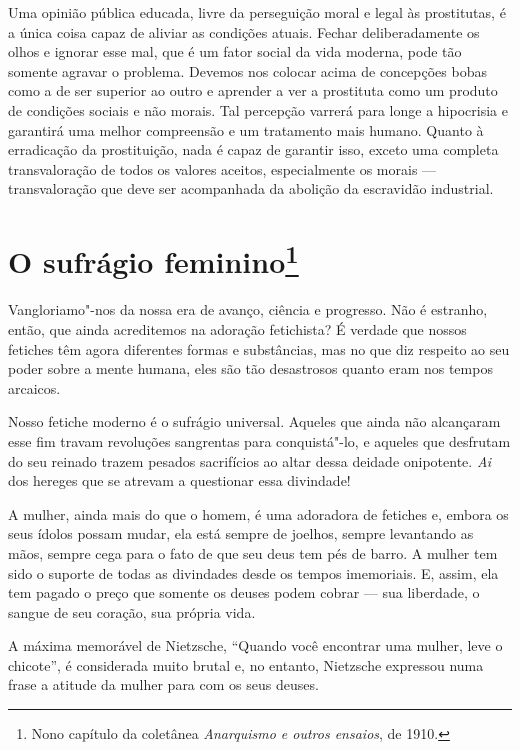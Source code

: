 Uma opinião pública educada, livre da perseguição moral e legal às
prostitutas, é a única coisa capaz de aliviar as condições atuais.
Fechar deliberadamente os olhos e ignorar esse mal, que é um fator
social da vida moderna, pode tão somente agravar o problema. Devemos nos
colocar acima de concepções bobas como a de ser superior ao outro e
aprender a ver a prostituta como um produto de condições sociais e não
morais. Tal percepção varrerá para longe a hipocrisia e garantirá uma
melhor compreensão e um tratamento mais humano. Quanto à erradicação da
prostituição, nada é capaz de garantir isso, exceto uma completa
transvaloração de todos os valores aceitos, especialmente os morais --- transvaloração que deve ser acompanhada da abolição da escravidão
industrial.

\chapter{O sufrágio feminino\footnote{Nono capítulo da coletânea \textit{Anarquismo
  e outros ensaios}, de 1910.}}

Vangloriamo"-nos da nossa era de avanço, ciência e progresso. Não é
estranho, então, que ainda acreditemos na adoração fetichista? É verdade
que nossos fetiches têm agora diferentes formas e substâncias, mas no
que diz respeito ao seu poder sobre a mente humana, eles são tão
desastrosos quanto eram nos tempos arcaicos.

Nosso fetiche moderno é o sufrágio universal. Aqueles que ainda não
alcançaram esse fim travam revoluções sangrentas para conquistá"-lo, e
aqueles que desfrutam do seu reinado trazem pesados ​​sacrifícios ao
altar dessa deidade onipotente. \textit{Ai} dos hereges que se atrevam a
questionar essa divindade!

A mulher, ainda mais do que o homem, é uma adoradora de fetiches e,
embora os seus ídolos possam mudar, ela está sempre de joelhos, sempre
levantando as mãos, sempre cega para o fato de que seu deus tem pés de\label{barro}
barro. A mulher tem sido o suporte de todas as divindades desde os tempos
imemoriais. E, assim, ela tem pagado o preço que somente os deuses podem
cobrar --- sua liberdade, o sangue de seu coração, sua própria vida.

A máxima memorável de Nietzsche, ``Quando você encontrar uma mulher,\label{herege}
leve o chicote'', é considerada muito brutal e, no entanto, Nietzsche
expressou numa frase a atitude da mulher para com os seus deuses.

